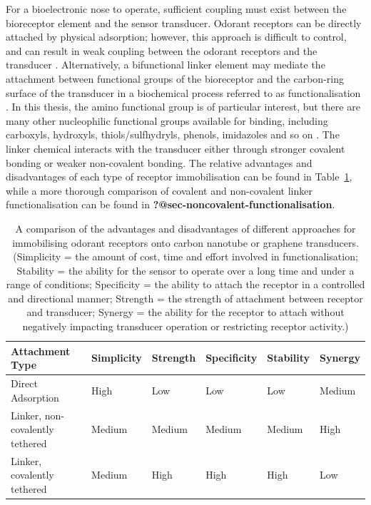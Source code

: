 \documentclass[
  a4paper,
]{scrbook}
\begin{document}
For a bioelectronic nose to operate, sufficient coupling must exist
between the bioreceptor element and the sensor transducer. Odorant
receptors can be directly attached by physical adsorption; however, this
approach is difficult to control, and can result in weak coupling
between the odorant receptors and the transducer
\autocite{Kwon2015,Dung2018}. Alternatively, a bifunctional linker
element may mediate the attachment between functional groups of the
bioreceptor and the carbon-ring surface of the transducer in a
biochemical process referred to as functionalisation
\autocite{Star2003a}. In this thesis, the amino functional group is of
particular interest, but there are many other nucleophilic functional
groups available for binding, including carboxyls, hydroxyls,
thiols/sulfhydryls, phenols, imidazoles and so on
\autocite{Fruh2011,Dung2018}. The linker chemical interacts with the
transducer either through stronger covalent bonding or weaker
non-covalent bonding. The relative advantages and disadvantages of each
type of receptor immobilisation can be found in
Table~\ref{tbl-functionalisation-types}, while a more thorough
comparison of covalent and non-covalent linker functionalisation can be
found in \textbf{?@sec-noncovalent-functionalisation}.

\hypertarget{tbl-functionalisation-types}{}
\begin{longtable}[t]{>{\raggedright\arraybackslash}p{5.4cm}>{\raggedright\arraybackslash}p{1.45cm}>{\raggedright\arraybackslash}p{1.3cm}>{\raggedright\arraybackslash}p{1.45cm}>{\raggedright\arraybackslash}p{1.3cm}>{\raggedright\arraybackslash}p{1.3cm}}
\caption{\label{tbl-functionalisation-types}A comparison of the advantages and disadvantages of different approaches
for immobilising odorant receptors onto carbon nanotube or graphene
transducers. (Simplicity = the amount of cost, time and effort involved
in functionalisation; Stability = the ability for the sensor to operate
over a long time and under a range of conditions; Specificity = the
ability to attach the receptor in a controlled and directional manner;
Strength = the strength of attachment between receptor and transducer;
Synergy = the ability for the receptor to attach without negatively
impacting transducer operation or restricting receptor activity.) }\tabularnewline

\toprule
Attachment Type & Simplicity & Strength & Specificity & Stability & Synergy\\
\midrule
Direct Adsorption & High & Low & Low & Low & Medium\\
Linker, non-covalently tethered & Medium & Medium & Medium & Medium & High\\
Linker, covalently tethered & Medium & High & High & High & Low\\
\bottomrule
\end{longtable}
\end{document}
